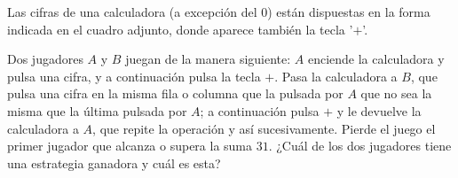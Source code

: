  Las cifras de una calculadora (a excepción del $0$) están dispuestas en la forma indicada en el cuadro adjunto, donde aparece también la tecla '$+$'.

    Dos jugadores $A$ y $B$ juegan de la manera siguiente: $A$ enciende la calculadora y pulsa una cifra, y a continuación pulsa la tecla $+$. Pasa la calculadora a $B$, que pulsa una cifra en la misma fila o columna que la pulsada por $A$ que no sea la misma que la última pulsada por $A$; a continuación pulsa $+$ y le devuelve la calculadora a $A$, que repite la operación y así sucesivamente. Pierde el juego el primer jugador que alcanza o supera la suma $31$. ¿Cuál de los dos jugadores tiene una estrategia ganadora y cuál es esta?

